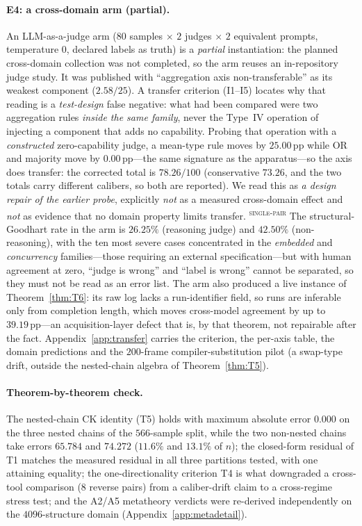 \documentclass{article}
\newcommand{\pp}{\,\mathrm{pp}}
\newcommand{\evtag}[1]{\textsuperscript{\textsc{#1}}}
\begin{document}
\paragraph{E4: a cross-domain arm (partial).} An LLM-as-a-judge arm ($80$ samples $\times$ $2$ judges
$\times$ $2$ equivalent prompts, temperature $0$, declared labels as truth) is a \emph{partial}
instantiation: the planned cross-domain collection was not completed, so the arm reuses an in-repository
judge study. It was published with ``aggregation axis non-transferable'' as its weakest component
($2.58/25$). A transfer criterion (I1--I5) locates why that reading is a \emph{test-design} false negative:
what had been compared were two aggregation rules \emph{inside the same family}, never the Type~IV
operation of injecting a component that adds no capability. Probing that operation with a \emph{constructed}
zero-capability judge, a mean-type rule moves by $25.00\pp$ while OR and majority move by $0.00\pp$---the
same signature as the apparatus---so the axis does transfer: the corrected total is $78.26/100$
(conservative $73.26$, and the two totals carry different calibers, so both are reported). We read this as
\emph{a design repair of the earlier probe}, explicitly \emph{not} as a measured cross-domain effect and
\emph{not} as evidence that no domain property limits transfer. \evtag{single-pair}
The structural-Goodhart rate in the arm is $26.25\%$ (reasoning judge) and $42.50\%$ (non-reasoning), with
the ten most severe cases concentrated in the \emph{embedded} and \emph{concurrency} families---those
requiring an external specification---but with human agreement at zero, ``judge is wrong'' and ``label is
wrong'' cannot be separated, so they must not be read as an error list. The arm also produced a live
instance of Theorem~\ref{thm:T6}: its raw log lacks a run-identifier field, so runs are inferable only from
completion length, which moves cross-model agreement by up to $39.19\pp$---an acquisition-layer defect that
is, by that theorem, not repairable after the fact. Appendix~\ref{app:transfer} carries the criterion, the
per-axis table, the domain predictions and the $200$-frame compiler-substitution pilot (a swap-type drift,
outside the nested-chain algebra of Theorem~\ref{thm:T5}).

\paragraph{Theorem-by-theorem check.} The nested-chain CK identity (T5) holds with maximum absolute error
$0.000$ on the three nested chains of the $566$-sample split, while the two non-nested chains take errors
$65.784$ and $74.272$ ($11.6\%$ and $13.1\%$ of $n$); the closed-form residual of T1 matches the measured
residual in all three partitions tested, with one attaining equality; the one-directionality criterion T4
is what downgraded a cross-tool comparison ($8$ reverse pairs) from a caliber-drift claim to a
cross-regime stress test; and the A2/A5 metatheory verdicts were re-derived independently on the
$4096$-structure domain (Appendix~\ref{app:metadetail}).
\end{document}
